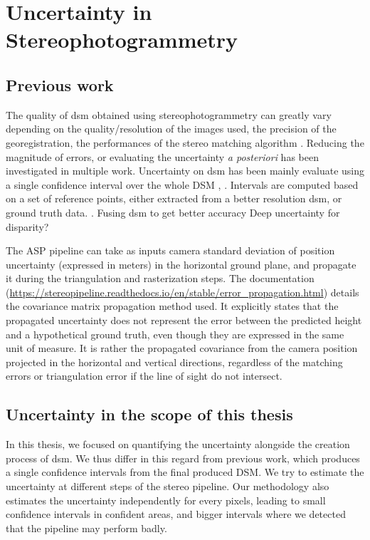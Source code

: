 \section{Uncertainty in Stereophotogrammetry}
\subsection{Previous work}
The quality of \acrshort{dsm} obtained using stereophotogrammetry can greatly vary depending on the quality/resolution of the images used, the precision of the georegistration, the performances of the stereo matching algorithm \etc. Reducing the magnitude of errors, or evaluating the uncertainty \textit{a posteriori} has been investigated in multiple work.
Uncertainty on \acrshort{dsm} has been mainly evaluate using a single confidence interval over the whole DSM \cite{hugonnet_uncertainty_2022, deschamps-berger_apport_2021, wang_robust_2015}, \cite{oksanen_digital_2006} \cite{panagiotakis_validation_2018}. Intervals are computed based on a set of reference points, either extracted from a better resolution \acrshort{dsm}, or ground truth data. . Fusing \acrshort{dsm} to get better accuracy \cite{qin_uncertainty-guided_2022}
\cite{hu_quantitative_2012,poggi_confidence_2021}
Deep uncertainty for disparity?

The ASP pipeline can take as inputs camera standard deviation of position uncertainty (expressed in meters) in the horizontal ground plane, and propagate it during the triangulation and rasterization steps. The documentation (\url{https://stereopipeline.readthedocs.io/en/stable/error_propagation.html}) details the covariance matrix propagation method used. It explicitly states that the propagated uncertainty does not represent the error between the predicted height and a hypothetical ground truth, even though they are expressed in the same unit of measure. It is rather the propagated covariance from the camera position projected in the horizontal and vertical directions, regardless of the matching errors or triangulation error if the line of sight do not intersect.

\subsection{Uncertainty in the scope of this thesis}
In this thesis, we focused on quantifying the uncertainty alongside the creation process of \acrshort{dsm}. We thus differ in this regard from previous work, which produces a single confidence intervals from the final produced DSM. We try to estimate the uncertainty at different steps of the stereo pipeline. Our methodology also estimates the uncertainty independently for every pixels, leading to small confidence intervals in confident areas, and bigger intervals where we detected that the pipeline may perform badly.

